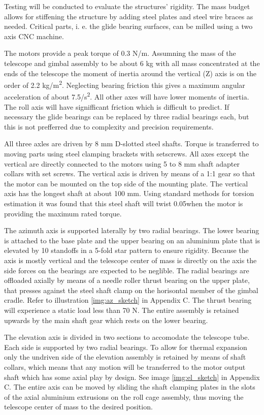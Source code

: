 Testing will be conducted to evaluate the structures' rigidity. The mass budget allows for stiffening the structure by adding steel plates and steel wire braces as needed. Critical parts, i. e. the glide bearing surfaces, can be milled using a two axis CNC machine.

The motors provide a peak torque of 0.3 N/m. Assumning the mass of the telescope and gimbal assembly to be about 6 kg with all mass concentrated at the ends of the telescope the moment of inertia around the vertical (Z) axis is on the order of 2.2 kg/m\textsuperscript{2}. Neglecting bearing friction this gives a maximum angular acceleration of about 7.5\textdegree/s\textsuperscript{2}. All other axes will have lower moments of inertia. The roll axis will have signifficant friction which is difficult to predict. If necessary the glide bearings can be replaced by three radial bearings each, but this is not prefferred due to complexity and precision requirements.

All three axles are driven by 8 mm D-slotted steel shafts. Torque is transferred to moving parts using steel clamping brackets with setscrews. All axes except the vertical are directly connected to the motors using 5 to 8 mm shaft adapter collars with set screws. The vertical axis is driven by means of a 1:1 gear so that the motor can be mounted on the top side of the mounting plate. The vertical axis has the longest shaft at about 100 mm. Using standard methods for torsion estimation it was found that this steel shaft will twist 0.05\textdegree when the motor is providing the maximum rated torque.

The azimuth axis is supported laterally by two radial bearings. The lower bearing is attached to the base plate and the upper bearing on an aluminium plate that is elevated by 10 standoffs in a 5-fold star pattern to ensure rigidity. Because the axis is mostly vertical and the telescope center of mass is directly on the axis the side forces on the bearings are expected to be neglible. The radial bearings are offloaded axially by means of a needle roller thrust bearing on the upper plate, that presses against the steel shaft clamp on the horisontal member of the gimbal cradle. Refer to illustration \ref{img:az_sketch} in Appendix C. The thrust bearing will experience a static load less than 70 N. The entire assembly is retained upwards by the main shaft gear which rests on the lower bearing.

The elevation axis is divided in two sections to accomodate the telescope tube. Each side is supported by two radial bearings. To allow for thermal expansion only the undriven side of the elevation assembly is retained by means of shaft collars, which means that any motion will be transferred to the motor output shaft which has some axial play by design. See image \ref{img:el_sketch} in Appendix C. The entire axis can be moved by sliding the shaft clamping plates in the slots of the axial aluminium extrusions on the roll cage assembly, thus moving the telescope center of mass to the desired position.

